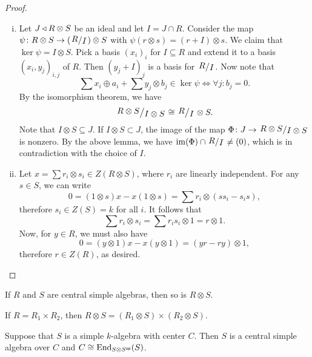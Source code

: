 \pagebreak[3]

\begin{proof}
\phantom{a}
\begin{enumerate}[i)]
\item Let $J \triangleleft R \otimes S$ be an ideal and let $I = J \cap R$.
Consider the map
$\psi \colon R \otimes S \to \br{\kvoc{R}{I}} \otimes S$ with
$\psi(r \otimes s) = (r + I) \otimes s$. We claim that
$\ker \psi = I \otimes S$. Pick a basis $(x_i)_i$ for
$I \subseteq R$ and extend it to a basis $(x_i, y_j)_{i,j}$ of $R$.
Then $(y_j + I)_j$ is a basis for $\kvoc{R}{I}$. Now note that
\[
\sum x_i \oplus a_i + \sum y_j \otimes b_j \in \ker \psi \iff
\forall j \colon b_j = 0.
\]
By the isomorphism theorem, we have
\[
\kvoc{R \otimes S}{I \otimes S} \cong \kvoc{R}{I} \otimes S.
\]
Note that $I \otimes S \subseteq J$. If $I \otimes S \subset J$,
the image of the map
$\Phi \colon J \to \kvoc{R \otimes S}{I \otimes S}$  is nonzero. By
the above lemma, we have $\im(\Phi) \cap \kvoc{R}{I} \ne (0)$,
which is in contradiction with the choice of $I$.
\item Let $x = \sum r_i \otimes s_i \in Z(R \otimes S)$, where
$r_i$ are linearly independent. For any $s \in S$, we can write
\[
0 =
(1 \otimes s) x - x (1 \otimes s) =
\sum r_i \otimes (s s_i - s_i s),
\]
therefore $s_i \in Z(S) = k$ for all $i$. It follows that
\[
\sum r_i \otimes s_i = \sum r_i s_i \otimes 1 = r \otimes 1.
\]
Now, for $y \in R$, we must also have
\[
0 =
(y \otimes 1) x - x (y \otimes 1) =
(yr - ry) \otimes 1,
\]
therefore $r \in Z(R)$, as desired. \qedhere
\end{enumerate}
\end{proof}

\begin{posledica}
If $R$ and $S$ are central simple algebras, then so is
$R \otimes S$.
\end{posledica}

\begin{opomba}
If $R = R_1 \times R_2$, then
$R \otimes S = (R_1 \otimes S) \times (R_2 \otimes S)$.
\end{opomba}

\begin{trditev}
Suppose that $S$ is a simple $k$-algebra with center $C$. Then $S$
is a central simple algebra over $C$ and
$C \cong \operatorname{End}_{S \otimes S^{\mathsf{op}}}(S)$.
\end{trditev}

